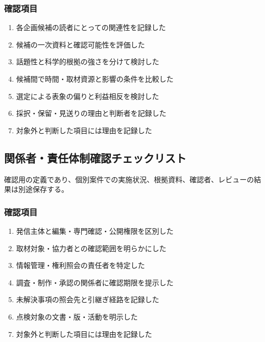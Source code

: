 \documentclass[a4paper,11pt]{article}
\begin{document}
\subsubsection*{確認項目}
\begin{enumerate}[leftmargin=2em,itemsep=0.3em]
\item 各企画候補の読者にとっての関連性を記録した\par
\item 候補の一次資料と確認可能性を評価した\par
\item 話題性と科学的根拠の強さを分けて検討した\par
\item 候補間で時間・取材資源と影響の条件を比較した\par
\item 選定による表象の偏りと利益相反を検討した\par
\item 採択・保留・見送りの理由と判断者を記録した\par
\item 対象外と判断した項目には理由を記録した\par
\end{enumerate}
\subsection{関係者・責任体制確認チェックリスト}
\par 確認用の定義であり、個別案件での実施状況、根拠資料、確認者、レビューの結果は別途保存する。\par\medskip
\subsubsection*{確認項目}
\begin{enumerate}[leftmargin=2em,itemsep=0.3em]
\item 発信主体と編集・専門確認・公開権限を区別した\par
\item 取材対象・協力者との確認範囲を明らかにした\par
\item 情報管理・権利照会の責任者を特定した\par
\item 調査・制作・承認の関係者に確認期限を提示した\par
\item 未解決事項の照会先と引継ぎ経路を記録した\par
\item 点検対象の文書・版・活動を明示した\par
\item 対象外と判断した項目には理由を記録した\par
\end{enumerate}
\end{document}
